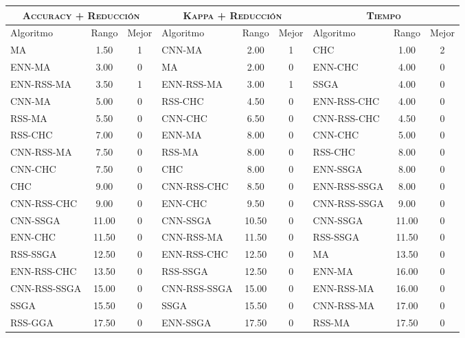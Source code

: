\begin{table}[]
\centering
\begin{adjustbox}{max width =\textwidth}
\begin{tabular}{l c c|l c c|l c c}
\hline
\multicolumn{3}{c|}{\textsc{Accuracy + Reducción}}
	& \multicolumn{3}{c|}{\textsc{Kappa + Reducción}}
	& \multicolumn{3}{c}{\textsc{Tiempo}} \\
\hline
Algoritmo & Rango & Mejor & Algoritmo & Rango & Mejor & Algoritmo & Rango & Mejor \\
\hline
\hline

MA           & 1.50  & 1 & CNN-MA       & 2.00  & 1 & CHC          &  1.00 & 2 \\
ENN-MA       & 3.00  & 0 & MA           & 2.00  & 0 & ENN-CHC      & 4.00  & 0 \\
ENN-RSS-MA   & 3.50  & 1 & ENN-RSS-MA   & 3.00  & 1 & SSGA         & 4.00  & 0 \\
CNN-MA       & 5.00  & 0 & RSS-CHC      & 4.50  & 0 & ENN-RSS-CHC  & 4.00  & 0 \\
RSS-MA       & 5.50  & 0 & CNN-CHC      & 6.50  & 0 & CNN-RSS-CHC  & 4.50  & 0 \\
RSS-CHC      & 7.00  & 0 & ENN-MA       & 8.00  & 0 & CNN-CHC      & 5.00  & 0 \\
CNN-RSS-MA   & 7.50  & 0 & RSS-MA       & 8.00  & 0 & RSS-CHC      & 8.00  & 0 \\
CNN-CHC      & 7.50  & 0 & CHC          & 8.00  & 0 & ENN-SSGA     &  8.00 & 0 \\
CHC          & 9.00  & 0 & CNN-RSS-CHC  & 8.50  & 0 & ENN-RSS-SSGA &  8.00 & 0 \\
CNN-RSS-CHC  & 9.00  & 0 & ENN-CHC      & 9.50  & 0 & CNN-RSS-SSGA & 9.00  & 0 \\
CNN-SSGA     & 11.00 & 0 & CNN-SSGA     & 10.50 & 0 & CNN-SSGA     & 11.00 & 0 \\
ENN-CHC      & 11.50 & 0 & CNN-RSS-MA   & 11.50 & 0 & RSS-SSGA     & 11.50 & 0 \\
RSS-SSGA     & 12.50 & 0 & ENN-RSS-CHC  & 12.50 & 0 & MA           & 13.50 & 0 \\
ENN-RSS-CHC  & 13.50 & 0 & RSS-SSGA     & 12.50 & 0 & ENN-MA       & 16.00 & 0 \\
CNN-RSS-SSGA & 15.00 & 0 & CNN-RSS-SSGA & 15.00 & 0 & ENN-RSS-MA   & 16.00 & 0 \\
SSGA         & 15.50 & 0 & SSGA         & 15.50 & 0 & CNN-RSS-MA   & 17.00 & 0 \\
RSS-GGA      & 17.50 & 0 & ENN-SSGA     & 17.50 & 0 & RSS-MA       & 17.50 & 0 \\

\end{tabular}
\end{adjustbox}
\end{table}
